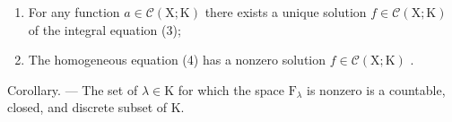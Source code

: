 \begin{enumerate}
\def\labelenumi{(\roman{enumi})}
\item
  For any function \(a \in \mathcal{C}(\mathrm{X};\mathrm{K})\) there exists a unique solution \(f \in \mathcal{C}(\mathrm{X};\mathrm{K})\) of the integral equation (3);
\item
  The homogeneous equation (4) has a nonzero solution \(f \in \mathcal{C}(\mathrm{X};\mathrm{K})\) .
\end{enumerate}

Corollary. --- The set of \(\lambda\in\mathrm{K}\) for which the space \(\mathrm{F}_{\lambda}\) is nonzero is a countable, closed, and discrete subset of K.

